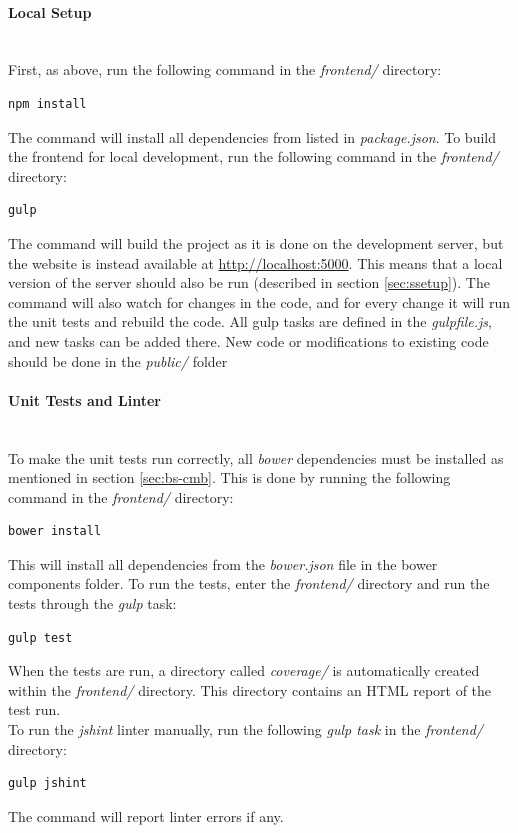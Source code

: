\paragraph*{Local Setup} \hfill \\
First, as above, run the following command in the \textit{frontend/} directory:
\begin{lstlisting}[language=sh]
npm install
\end{lstlisting}
The command will install all dependencies from listed in \textit{package.json}.
\noindent
To build the frontend for local development, run the following command in the \textit{frontend/} directory:
\begin{lstlisting}
gulp
\end{lstlisting}
The command will build the project as it is done on the development server, but the website is instead available at \url{http://localhost:5000}. This means that a local version of the server should also be run (described in section \ref{sec:ssetup}). The command will also watch for changes in the code, and for every change it will run the unit tests and rebuild the code. All gulp tasks are defined in the \textit{gulpfile.js}, and new tasks can be added there. New code or modifications to existing code should be done in the \textit{public/} folder

\paragraph*{Unit Tests and Linter} \hfill \\
To make the unit tests run correctly, all \textit{bower} \cite{m:bower} dependencies must be installed as mentioned in section \ref{sec:bs-cmb}. This is done by running the following command in the \textit{frontend/} directory:
\begin{lstlisting}[language=sh]
bower install
\end{lstlisting}
This will install all dependencies from the \textit{bower.json} file in the bower components folder. To run the tests, enter the \textit{frontend/} directory and run the tests through the \textit{gulp} task:
\begin{lstlisting}
gulp test
\end{lstlisting}
When the tests are run, a directory called \textit{coverage/} is automatically created within the \textit{frontend/} directory. This directory contains an HTML report of the test run.\\

To run the \textit{jshint} \cite{m:jshint} linter manually, run the following \textit{gulp task} in the \textit{frontend/} directory:
\begin{lstlisting}[language=sh]
gulp jshint
\end{lstlisting}
The command will report linter errors if any.

